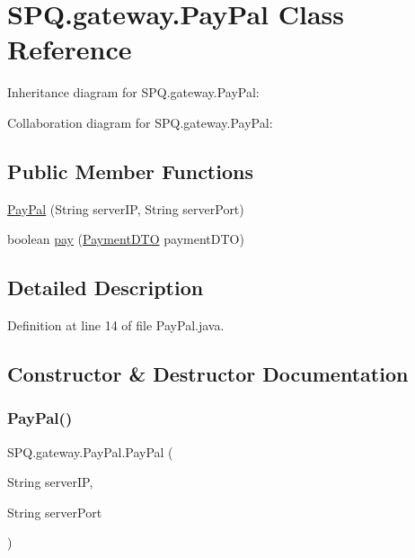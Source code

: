 \hypertarget{class_s_p_q_1_1gateway_1_1_pay_pal}{}\section{S\+P\+Q.\+gateway.\+Pay\+Pal Class Reference}
\label{class_s_p_q_1_1gateway_1_1_pay_pal}


Inheritance diagram for S\+P\+Q.\+gateway.\+Pay\+Pal\+:


Collaboration diagram for S\+P\+Q.\+gateway.\+Pay\+Pal\+:
\subsection*{Public Member Functions}
\begin{DoxyCompactItemize}
\item 
\mbox{\hyperlink{class_s_p_q_1_1gateway_1_1_pay_pal_ab34e6213b4dbfeccc87da6bcd486bbf3}{Pay\+Pal}} (String server\+IP, String server\+Port)
\item 
boolean \mbox{\hyperlink{class_s_p_q_1_1gateway_1_1_pay_pal_a4f12e3d9fd7cc1ebf54e885df464f1d4}{pay}} (\mbox{\hyperlink{class_s_p_q_1_1dto_1_1_payment_d_t_o}{Payment\+D\+TO}} payment\+D\+TO)
\end{DoxyCompactItemize}


\subsection{Detailed Description}


Definition at line 14 of file Pay\+Pal.\+java.



\subsection{Constructor \& Destructor Documentation}
\mbox{\label{class_s_p_q_1_1gateway_1_1_pay_pal_ab34e6213b4dbfeccc87da6bcd486bbf3}} 
\subsubsection{\texorpdfstring{Pay\+Pal()}{PayPal()}}
{\footnotesize\ttfamily S\+P\+Q.\+gateway.\+Pay\+Pal.\+Pay\+Pal (\begin{DoxyParamCaption}\item[{String}]{server\+IP,  }\item[{String}]{server\+Port }\end{DoxyParamCaption})}



